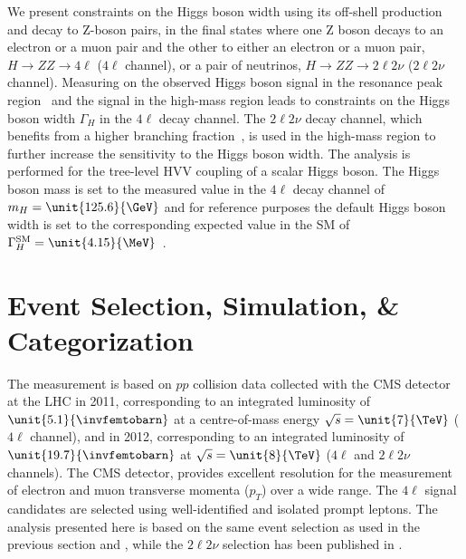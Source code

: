 We present constraints on the Higgs boson width using its off-shell production and decay
to Z-boson pairs, in the final states where one Z boson decays to an electron or a muon pair and the
other to either an electron or a muon pair, $H \to ZZ \to 4\ell$ ($4\ell$ channel), or a pair
of neutrinos, $H \to ZZ \to 2\ell2\nu$ ($2\ell2\nu$ channel). Measuring on the observed Higgs boson
signal in the resonance peak region~\cite{Chatrchyan:2013mxa} and the
signal in the high-mass region leads to constraints on the Higgs boson width $\Gamma_{H}$ in the $4\ell$ decay
channel. The $2\ell 2\nu$ decay channel, which benefits from a higher branching fraction~\cite{Chatrchyan:2013yoa,Chatrchyan:2012ft},
is used in the high-mass region to further increase the sensitivity to the Higgs boson width.
The analysis is performed for the tree-level HVV coupling of a scalar Higgs boson. The Higgs boson mass is set to the
measured value in the $4\ell$ decay channel of $m_H = \unit{125.6}{\GeV}$ \cite{Chatrchyan:2013mxa} and for reference purposes the default Higgs boson width is set to the corresponding expected value in the SM of
$\Gamma_{H}^{\textrm{SM}} = \unit{4.15}{\MeV}$~\cite{Dittmaier:2011ti,Heinemeyer:2013tqa}.

\section{Event Selection, Simulation, \& Categorization}
\label{sec:ZZ4l_ZZ2l2nu_Analysis}

The measurement is based on $pp$ collision data collected with the CMS detector at the LHC in 2011, corresponding to an integrated luminosity of $\unit{5.1}{\invfemtobarn}$ at a centre-of-mass energy $\sqrt{s} = \unit{7}{\TeV}$ ($4\ell$ channel), and in 2012, corresponding to an integrated luminosity of $\unit{19.7}{\invfemtobarn}$ at $\sqrt{s} = \unit{8}{\TeV}$ ($4\ell$ and $2\ell2\nu$ channels). The CMS detector, provides excellent resolution for the measurement of electron and muon transverse momenta ($p_{T}$) over a wide range. The $4\ell$ signal candidates are selected using well-identified and isolated prompt leptons. The analysis presented here is based on the same event selection as used in the previous section and \cite{Chatrchyan:2013mxa}, while the $2\ell2\nu$ selection has been published in \cite{Chatrchyan:2013yoa}.

